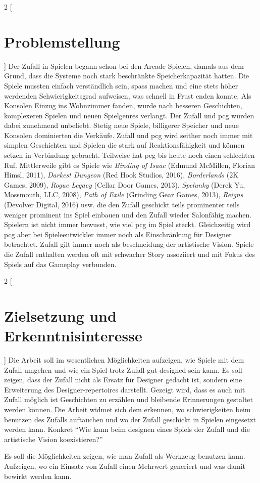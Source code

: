 \documentclass[10pt,a4paper]{article}
\begin{document}
\begin{multicols}{2}
[
\section{Problemstellung}
]
Der Zufall in Spielen begann schon bei den Arcade-Spielen, damals aus dem Grund, dass die Systeme noch stark beschränkte Speicherkapazität hatten. Die Spiele mussten einfach verständlich sein, spass machen und eine stets höher werdenden Schwierigkeitsgrad aufweisen, was schnell in Frust enden konnte. Als Konsolen Einzug ins Wohnzimmer fanden, wurde nach besseren Geschichten, komplexeren Spielen und neuen Spielgenres verlangt. Der Zufall und \gls{pcg} wurden dabei zunehmend unbeliebt. Stetig neue Spiele, billigerer Speicher und neue Konsolen dominierten die Verkäufe. Zufall und \gls{pcg} wird seither noch immer mit simplen Geschichten und Spielen die stark auf Reaktionsfähigkeit und können setzen in Verbindung gebracht. Teilweise hat \gls{pcg} bis heute noch einen schlechten Ruf. Mittlerweile gibt es Spiele wie \textit{Binding of Isaac} (Edmund McMillen, Florian Himsl, 2011), \textit{Darkest Dungeon} (Red Hook Studios, 2016), \textit{Borderlands} (2K Games, 2009), \textit{Rogue Legacy} (Cellar Door Games, 2013), \textit{Spelunky} (Derek Yu, Mossmouth, LLC, 2008), \textit{Path of Exile} (Grinding Gear Games, 2013), \textit{Reigns} (Devolver Digital, 2016) usw. die den Zufall geschickt teils prominenter teils weniger prominent ins Spiel einbauen und den Zufall wieder Salonfähig machen. Spielern ist nicht immer bewusst, wie viel \gls{pcg} im Spiel steckt. Gleichzeitig wird \gls{pcg} aber bei Spieleentwickler immer noch als Einschränkung für Designer betrachtet. Zufall gilt immer noch als beschneidung der artistische Vision. Spiele die Zufall enthalten werden oft mit schwacher Story assoziiert und mit Fokus des Spiels auf das Gameplay verbunden.
\end{multicols}

\begin{multicols}{2}
[
\section{Zielsetzung und Erkenntnisinteresse}
]
Die Arbeit soll im wesentlichen Möglichkeiten aufzeigen, wie Spiele mit dem Zufall umgehen und wie ein Spiel trotz Zufall gut designed sein kann. Es soll zeigen, dass der Zufall nicht als Ersatz für Designer gedacht ist, sondern eine Erweiterung des Designer-repertoires darstellt. Gezeigt wird, dass es auch mit Zufall möglich ist Geschichten zu erzählen und bleibende Erinnerungen gestaltet werden können. Die Arbeit widmet sich dem erkennen, wo schwierigkeiten beim benutzen des Zufalls auftauchen und wo der Zufall geschickt in Spielen eingesetzt werden kann. Konkret “Wie kann beim designen eines Spiels der Zufall und die artistische Vision koexistieren?”

Es soll die Möglichkeiten zeigen, wie man Zufall als Werkzeug benutzen kann. Aufzeigen, wo ein Einsatz von Zufall einen Mehrwert generiert und was damit bewirkt werden kann.
\end{multicols}
\end{document}

